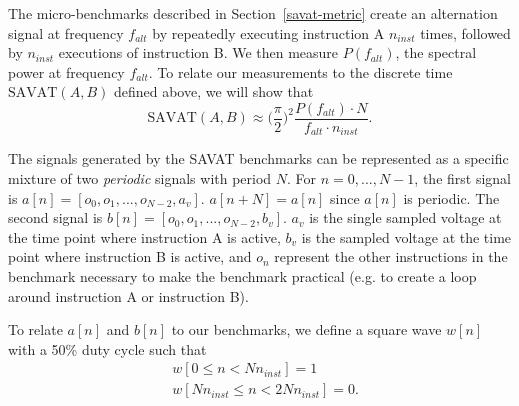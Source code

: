 The micro-benchmarks described in Section~\ref{savat-metric} create an alternation signal at frequency $f_{alt}$ by repeatedly executing instruction A $n_{inst}$ times, followed by $n_{inst}$ executions of instruction B. We then measure $P(f_{alt})$, the spectral power at frequency $f_{alt}$. To relate our measurements to the discrete time $\textrm{SAVAT}(A,B)$ defined above, we will show that 
\begin{equation}
  \label{eqn:meas_ese}
  \textrm{SAVAT}(A,B) \approx \Big(\frac{\pi}{2}\Big)^2 \frac{P(f_{alt}) \cdot N}{f_{alt} \cdot n_{inst}}.
\end{equation}

The signals generated by the SAVAT benchmarks can be represented as a specific mixture of two \textit{periodic} signals with period $N$. For $n=0,...,N-1$, the first signal is $a[n] = [o_0, o_1, ..., o_{N-2}, a_v]$. $a[n+N] = a[n]$ since $a[n]$ is periodic. The second signal is $b[n] = [o_0, o_1, ..., o_{N-2}, b_v]$. $a_v$ is the single sampled voltage at the time point where instruction A is active, $b_v$ is the sampled voltage at the time point where instruction B is active, and $o_n$ represent the other instructions in the benchmark necessary to make the benchmark practical (e.g. to create a loop around instruction A or instruction B).

\begin{comment}
  For the $n=0,...,N-1$ portion of $a[n]$ and $b[n]$, we see that 
  \begin{equation}
    \begin{aligned}
      \textrm{SAVAT}(a[n],b[n]) & = \frac{T_I}{R} \sum_{n=0}^{N} (a[n]-b[n])^2 \\
      & = \frac{T_I}{R} (a[N-1] - b[N-1])^2 \\
      & = \frac{T_I}{R} (a_v - b_v)^2 \\
      & = \textrm{SAVAT}(A,B).
    \end{aligned}
  \end{equation}
\end{comment}

To relate $a[n]$ and $b[n]$ to our benchmarks, we define a square wave $w[n]$ with a 50\% duty cycle such that
\begin{equation} \begin{aligned}
    & w[0  \leq n < N n_{inst}] = 1 \\
    & w[N n_{inst} \leq  n < 2N n_{inst}] = 0.
\end{aligned} \end{equation}


